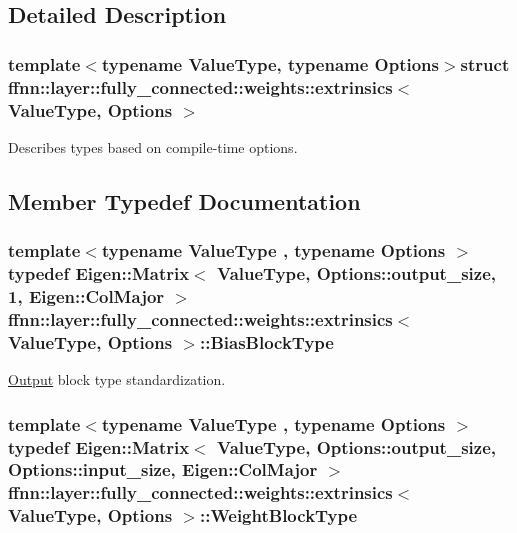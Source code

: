 \subsection{Detailed Description}
\subsubsection*{template$<$typename Value\-Type, typename Options$>$struct ffnn\-::layer\-::fully\-\_\-connected\-::weights\-::extrinsics$<$ Value\-Type, Options $>$}

Describes types based on compile-\/time options. 

\subsection{Member Typedef Documentation}
\hypertarget{structffnn_1_1layer_1_1fully__connected_1_1weights_1_1extrinsics_a7ea91263929a2b1b067b8c77a37f92a4}{
\subsubsection[{Bias\-Block\-Type}]{\setlength{\rightskip}{0pt plus 5cm}template$<$typename Value\-Type , typename Options $>$ typedef Eigen\-::\-Matrix$<$ Value\-Type, Options\-::output\-\_\-size, 1, Eigen\-::\-Col\-Major $>$ {\bf ffnn\-::layer\-::fully\-\_\-connected\-::weights\-::extrinsics}$<$ Value\-Type, Options $>$\-::{\bf Bias\-Block\-Type}}}\label{structffnn_1_1layer_1_1fully__connected_1_1weights_1_1extrinsics_a7ea91263929a2b1b067b8c77a37f92a4}


\hyperlink{classffnn_1_1layer_1_1_output}{Output} block type standardization. 

\hypertarget{structffnn_1_1layer_1_1fully__connected_1_1weights_1_1extrinsics_a0c2c0299f0112bdcbcc72f9cf7af9bf6}{
\subsubsection[{Weight\-Block\-Type}]{\setlength{\rightskip}{0pt plus 5cm}template$<$typename Value\-Type , typename Options $>$ typedef Eigen\-::\-Matrix$<$ Value\-Type, Options\-::output\-\_\-size, Options\-::input\-\_\-size, Eigen\-::\-Col\-Major $>$ {\bf ffnn\-::layer\-::fully\-\_\-connected\-::weights\-::extrinsics}$<$ Value\-Type, Options $>$\-::{\bf Weight\-Block\-Type}}}\label{structffnn_1_1layer_1_1fully__connected_1_1weights_1_1extrinsics_a0c2c0299f0112bdcbcc72f9cf7af9bf6}



